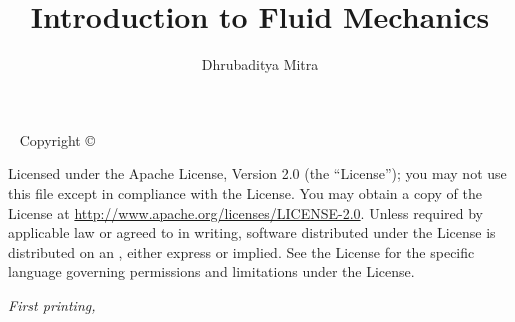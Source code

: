 \documentclass{tufte-book} %
\title{Introduction to Fluid Mechanics} %
\author[]{Dhrubaditya Mitra} %
\begin{document}
\frontmatter


\thispagestyle{empty}
\vfill


\maketitle %


\newpage
\begin{fullwidth}
~\vfill
\thispagestyle{empty}
\setlength{\parindent}{0pt}
\setlength{\parskip}{\baselineskip}
Copyright \copyright\ \the\year\ \thanklessauthor

\par{}

\par{}

\par Licensed under the Apache License, Version 2.0 (the ``License''); you may not use this file except in compliance with the License. You may obtain a copy of the License at \url{http://www.apache.org/licenses/LICENSE-2.0}. Unless required by applicable law or agreed to in writing, software distributed under the License is distributed on an , either express or implied. See the License for the specific language governing permissions and limitations under the License.

\par\textit{First printing, \monthyear}
\end{fullwidth}

\end{document}
